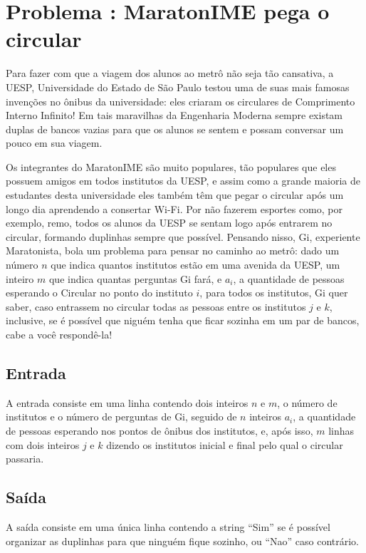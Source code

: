 \section*{Problema \proxLetra: MaratonIME pega o circular}

Para fazer com que a viagem dos alunos ao metrô não seja tão cansativa, a UESP, Universidade do Estado de São Paulo testou uma de suas mais famosas invenções no ônibus da universidade: eles criaram os circulares de Comprimento Interno Infinito! Em tais maravilhas da Engenharia Moderna sempre existam duplas de bancos vazias para que os alunos se sentem e possam conversar um pouco em sua viagem.
 
Os integrantes do MaratonIME são muito populares, tão populares que eles possuem amigos em todos institutos da UESP, e assim como a grande maioria de estudantes desta universidade eles também têm que pegar o circular após um longo dia aprendendo a consertar Wi-Fi. Por não fazerem esportes como, por exemplo, remo, todos os alunos da UESP se sentam logo após entrarem no circular, formando duplinhas sempre que possível. Pensando nisso, Gi, experiente Maratonista, bola um problema para pensar no caminho ao metrô: dado um número $n$ que indica quantos institutos estão em uma avenida da UESP, um inteiro $m$ que indica quantas perguntas Gi fará, e $a_i$, a quantidade de pessoas esperando o Circular no ponto do instituto $i$, para todos os institutos, Gi quer saber, caso entrassem no circular todas as pessoas entre os institutos $j$ e $k$, inclusive, se é possível que niguém tenha que ficar sozinha em um par de bancos, cabe a você respondê-la! 


\subsection*{Entrada}
\textoDiversasInstanciasEOF

A entrada consiste em uma linha contendo dois inteiros $n$ e $m$, o número de institutos e o número de perguntas de Gi, seguido de $n$ inteiros $a_i$, a quantidade de pessoas esperando nos pontos de ônibus dos institutos, e, após isso, $m$ linhas com dois inteiros $j$ e $k$ dizendo os institutos inicial e final pelo qual o circular passaria.


\subsection*{Saída}

A saída consiste em uma única linha contendo a string ``Sim'' se é possível organizar as duplinhas para que ninguém fique sozinho, ou ``Nao'' caso contrário.

